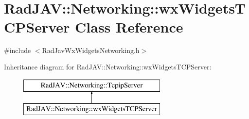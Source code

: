 \hypertarget{class_rad_j_a_v_1_1_networking_1_1wx_widgets_t_c_p_server}{}\section{Rad\+J\+AV\+:\+:Networking\+:\+:wx\+Widgets\+T\+C\+P\+Server Class Reference}
\label{class_rad_j_a_v_1_1_networking_1_1wx_widgets_t_c_p_server}


{\ttfamily \#include $<$Rad\+Jav\+Wx\+Widgets\+Networking.\+h$>$}

Inheritance diagram for Rad\+J\+AV\+:\+:Networking\+:\+:wx\+Widgets\+T\+C\+P\+Server\+:\begin{figure}[H]
\begin{center}
\leavevmode
\includegraphics[height=2.000000cm]{class_rad_j_a_v_1_1_networking_1_1wx_widgets_t_c_p_server}
\end{center}
\end{figure}
